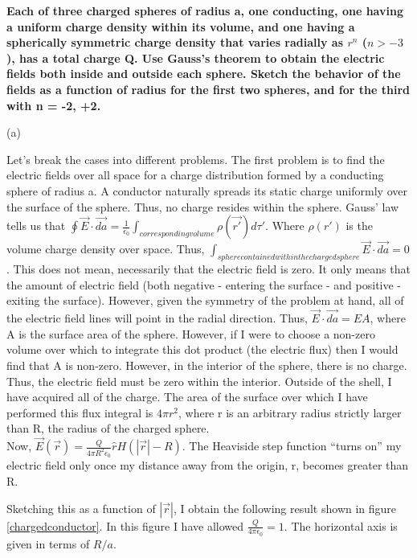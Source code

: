 \begin{homeworkProblem}

\textbf{Each of three charged spheres of radius a, one conducting, one having a uniform 
charge density within its volume, and one having a spherically symmetric charge 
density that varies radially as $r^n$ ($n> -3$), has a total charge Q. Use Gauss's theorem 
to obtain the electric fields both inside and outside each sphere. Sketch the behavior 
of the fields as a function of radius for the first two spheres, and for the third with 
n = -2, +2. }

\begin{homeworkSection}{(a)}

Let's break the cases into different problems. The first problem is to find the electric fields over all space for a charge distribution formed by a conducting sphere of radius a. A conductor naturally spreads its static charge uniformly over the surface of the sphere. Thus, no charge resides within the sphere. Gauss' law tells us that $\oint \vec{E}\cdot \vec{da} = \frac{1}{\epsilon_0} \int_{correspondingvolume} \rho(\vec{r'})d\tau'$. Where $\rho(r')$ is the volume charge density over space. Thus, $\int_{sphere contained within the charged sphere} \vec{E} \cdot \vec{da} = 0$. This does not mean, necessarily that the electric field is zero. It only means that the amount of electric field (both negative - entering the surface - and positive - exiting the surface). However, given the symmetry of the problem at hand, all of the electric field lines will point in the radial direction. Thus, $\vec{E}\cdot \vec{da} = E A$, where A is the surface area of the sphere. However, if I were to choose a non-zero volume over which to integrate this dot product (the electric flux) then I would find that A is non-zero. However, in the interior of the sphere, there is no charge. Thus, the electric field must be zero within the interior. Outside of the shell, I have acquired all of the charge. The area of the surface over which I have performed this flux integral is $4\pi r^2$, where r is an arbitrary radius strictly larger than R, the radius of the charged sphere.
\\
Now, $\vec{E}(\vec{r})= \frac{Q}{4\pi R^2 \epsilon_0} \hat{r} H(|\vec{r}|-R)$. The Heaviside step function ``turns on'' my electric field only once my distance away from the origin, r, becomes greater than R.

Sketching this as a function of $|\vec{r}|$, I obtain the following result shown in figure \ref{chargedconductor}. In this figure I have allowed $\frac{Q}{4\pi \epsilon_0} = 1$. The horizontal axis is given in terms of $R/a$.


\end{homeworkSection}
\end{homeworkProblem}
